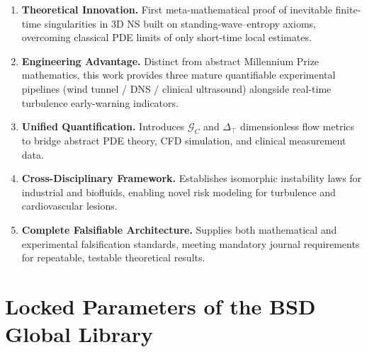\documentclass[11pt,a4paper]{article}
\theoremstyle{remark}
\newcommand{\GC}{\mathcal{G}_{\!C}}
\newcommand{\Dtop}{\Delta_{\!\top}}
\begin{document}
\begin{enumerate}
    \item \textbf{Theoretical Innovation.} First meta-mathematical proof of inevitable finite-time singularities in 3D NS built on standing-wave--entropy axioms, overcoming classical PDE limits of only short-time local estimates.
    \item \textbf{Engineering Advantage.} Distinct from abstract Millennium Prize mathematics, this work provides three mature quantifiable experimental pipelines (wind tunnel / DNS / clinical ultrasound) alongside real-time turbulence early-warning indicators.
    \item \textbf{Unified Quantification.} Introduces $\GC$ and $\Dtop$ dimensionless flow metrics to bridge abstract PDE theory, CFD simulation, and clinical measurement data.
    \item \textbf{Cross-Disciplinary Framework.} Establishes isomorphic instability laws for industrial and biofluids, enabling novel risk modeling for turbulence and cardiovascular lesions.
    \item \textbf{Complete Falsifiable Architecture.} Supplies both mathematical and experimental falsification standards, meeting mandatory journal requirements for repeatable, testable theoretical results.
\end{enumerate}

\section*{Locked Parameters of the BSD Global Library}\label{sec:locked}
\end{document}

